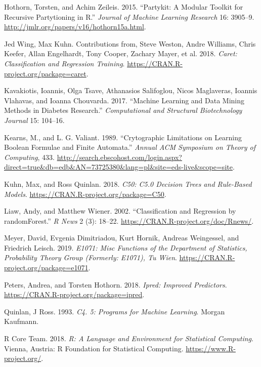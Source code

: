 \documentclass[]{book}
\theoremstyle{plain}
\theoremstyle{definition}
\theoremstyle{definition}
\theoremstyle{definition}
\theoremstyle{definition}
\theoremstyle{remark}
\begin{document}
\leavevmode\hypertarget{ref-R-partykit}{}%
Hothorn, Torsten, and Achim Zeileis. 2015. ``Partykit: A Modular Toolkit for Recursive Partytioning in R.'' \emph{Journal of Machine Learning Research} 16: 3905--9. \url{http://jmlr.org/papers/v16/hothorn15a.html}.

\leavevmode\hypertarget{ref-kuhn}{}%
Jed Wing, Max Kuhn. Contributions from, Steve Weston, Andre Williams, Chris Keefer, Allan Engelhardt, Tony Cooper, Zachary Mayer, et al. 2018. \emph{Caret: Classification and Regression Training}. \url{https://CRAN.R-project.org/package=caret}.

\leavevmode\hypertarget{ref-kavakiotis2017}{}%
Kavakiotis, Ioannis, Olga Tsave, Athanasios Salifoglou, Nicos Maglaveras, Ioannis Vlahavas, and Ioanna Chouvarda. 2017. ``Machine Learning and Data Mining Methods in Diabetes Research.'' \emph{Computational and Structural Biotechnology Journal} 15: 104--16.

\leavevmode\hypertarget{ref-kearns1989}{}%
Kearns, M., and L. G. Valiant. 1989. ``Crytographic Limitations on Learning Boolean Formulae and Finite Automata.'' \emph{Annual ACM Symposium on Theory of Computing}, 433. \url{http://search.ebscohost.com/login.aspx?direct=true\&db=edb\&AN=73725380\&lang=pl\&site=eds-live\&scope=site}.

\leavevmode\hypertarget{ref-R-C50}{}%
Kuhn, Max, and Ross Quinlan. 2018. \emph{C50: C5.0 Decision Trees and Rule-Based Models}. \url{https://CRAN.R-project.org/package=C50}.

\leavevmode\hypertarget{ref-R-las}{}%
Liaw, Andy, and Matthew Wiener. 2002. ``Classification and Regression by randomForest.'' \emph{R News} 2 (3): 18--22. \url{https://CRAN.R-project.org/doc/Rnews/}.

\leavevmode\hypertarget{ref-R-e1071}{}%
Meyer, David, Evgenia Dimitriadou, Kurt Hornik, Andreas Weingessel, and Friedrich Leisch. 2019. \emph{E1071: Misc Functions of the Department of Statistics, Probability Theory Group (Formerly: E1071), Tu Wien}. \url{https://CRAN.R-project.org/package=e1071}.

\leavevmode\hypertarget{ref-R-ipred}{}%
Peters, Andrea, and Torsten Hothorn. 2018. \emph{Ipred: Improved Predictors}. \url{https://CRAN.R-project.org/package=ipred}.

\leavevmode\hypertarget{ref-quinlan1993}{}%
Quinlan, J Ross. 1993. \emph{C4. 5: Programs for Machine Learning}. Morgan Kaufmann.

\leavevmode\hypertarget{ref-R-base}{}%
R Core Team. 2018. \emph{R: A Language and Environment for Statistical Computing}. Vienna, Austria: R Foundation for Statistical Computing. \url{https://www.R-project.org/}.
\end{document}
